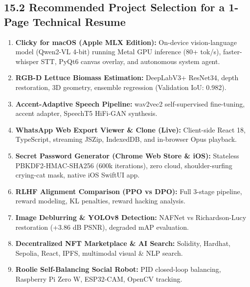 \documentclass[10pt,a4paper]{article}
\begin{document}
\subsection{15.2 Recommended Project Selection for a 1-Page Technical Resume}
\begin{tcolorbox}[enhanced, colback=lightbg, colframe=cardborder, boxrule=0.5pt, arc=3pt, left=8pt, right=8pt, top=5pt, bottom=5pt]
  \begin{enumerate}[leftmargin=14pt, itemsep=1.5pt, topsep=1pt]
    \item \textbf{Clicky for macOS (Apple MLX Edition):} On-device vision-language model (Qwen2-VL 4-bit) running Metal GPU inference (80+ tok/s), faster-whisper STT, PyQt6 canvas overlay, and autonomous system agent.
    \item \textbf{RGB-D Lettuce Biomass Estimation:} DeepLabV3+ ResNet34, depth restoration, 3D geometry, ensemble regression (Validation IoU: 0.982).
    \item \textbf{Accent-Adaptive Speech Pipeline:} wav2vec2 self-supervised fine-tuning, accent adapter, SpeechT5 HiFi-GAN synthesis.
    \item \textbf{WhatsApp Web Export Viewer \& Clone (Live):} Client-side React 18, TypeScript, streaming JSZip, IndexedDB, and in-browser Opus playback.
    \item \textbf{Secret Password Generator (Chrome Web Store \& iOS):} Stateless PBKDF2-HMAC-SHA256 (600k iterations), zero cloud, shoulder-surfing crying-cat mask, native iOS SwiftUI app.
    \item \textbf{RLHF Alignment Comparison (PPO vs DPO):} Full 3-stage pipeline, reward modeling, KL penalties, reward hacking analysis.
    \item \textbf{Image Deblurring \& YOLOv8 Detection:} NAFNet vs Richardson-Lucy restoration (+3.86 dB PSNR), degraded mAP evaluation.
    \item \textbf{Decentralized NFT Marketplace \& AI Search:} Solidity, Hardhat, Sepolia, React, IPFS, multimodal visual \& NLP search.
    \item \textbf{Roolie Self-Balancing Social Robot:} PID closed-loop balancing, Raspberry Pi Zero W, ESP32-CAM, OpenCV tracking.
  \end{enumerate}
\end{tcolorbox}
\end{document}
